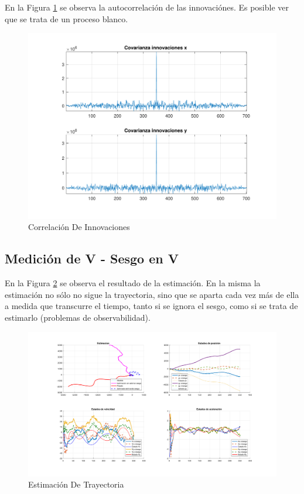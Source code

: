 	En la Figura \ref{fig:ej4b_cov} se observa la autocorrelación de las innovaciónes. Es posible ver que se trata de un proceso blanco.
	
	\begin{figure}[H]
		\centering
		\includegraphics[width=1.0\textwidth,keepaspectratio]{Figuras/covinn_ej4b.pdf}
		\caption{Correlación De Innovaciones}
		\label{fig:ej4b_cov}
	\end{figure}
	
	
\subsection{Medición de V - Sesgo en V}

	En la Figura \ref{fig:ej4c} se observa el resultado de la estimación. En la misma la estimación no sólo no sigue la trayectoria, sino que se aparta cada vez más de ella a medida que transcurre el tiempo, tanto si se ignora el sesgo, como si se trata de estimarlo (problemas de observabilidad).

	\begin{figure}[H]
		\centering
		\includegraphics[scale=0.5,trim={6,5cm 0 0 0}]{Figuras/graf_ej4c.pdf}
		\caption{Estimación De Trayectoria}
		\label{fig:ej4c}
	\end{figure}
	
